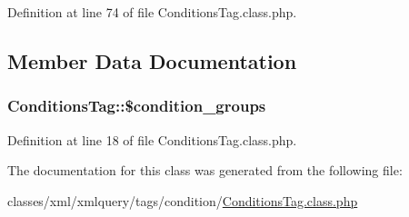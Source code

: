 Definition at line 74 of file Conditions\-Tag.\-class.\-php.



\subsection{Member Data Documentation}
\hypertarget{classConditionsTag_a494a016d168c8e44cd05638e6c991805}{
\subsubsection[{\$condition\-\_\-groups}]{\setlength{\rightskip}{0pt plus 5cm}Conditions\-Tag\-::\$condition\-\_\-groups}}\label{classConditionsTag_a494a016d168c8e44cd05638e6c991805}


Definition at line 18 of file Conditions\-Tag.\-class.\-php.



The documentation for this class was generated from the following file\-:\begin{DoxyCompactItemize}
\item 
classes/xml/xmlquery/tags/condition/\hyperlink{ConditionsTag_8class_8php}{Conditions\-Tag.\-class.\-php}\end{DoxyCompactItemize}
